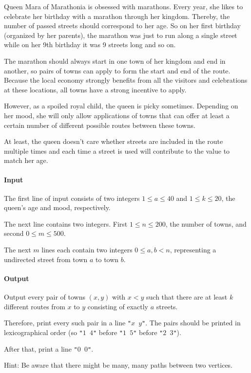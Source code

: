 




Queen Mara of Marathonia is obsessed with marathons. Every year, she likes to celebrate her birthday with a marathon through her kingdom. Thereby, the number of passed streets should correspond to her age. So on her first birthday (organized by her parents), the marathon was just to run along a single street while on her 9th birthday it was 9 streets long and so on.

The marathon should always start in one town of her kingdom and end in another, so pairs of towns can apply to form the start and end of the route. Because the local economy strongly benefits from all the visitors and celebrations at these locations, all towns have a strong incentive to apply.

However, as a spoiled royal child, the queen is picky sometimes. Depending on her mood, she will only allow applications of towns that can offer at least a certain number of different possible routes between these towns.

At least, the queen doesn't care whether streets are included in the route multiple times and each time a street is used will contribute to the value to match her age.

\paragraph*{Input}

The first line of input consists of two integers \(1\le a \le 40\) and \(1\le k \le 20\), the queen's age and mood, respectively.

The next line contains two integers. First \(1 \le n \le 200\), the number of towns, and second \(0\le m \le 500\). 

The next \(m\) lines each contain two integers \(0 \le a,b < n\), representing a undirected street from town \(a\) to town \(b\). 

\paragraph*{Output}
Output every pair of towns \((x,y)\) with \(x < y\) such that there are at least \(k\) different routes from \(x\) to \(y\) consisting of exactly \(a\) streets.

Therefore, print every such pair in a line \texttt{"\(x\) \(y\)"}. The pairs should be printed in lexicographical order (so \texttt{"\(1\) \(4\)"} before \texttt{"\(1\) \(5\)"} before \texttt{"\(2\) \(3\)"}).

After that, print a line \texttt{"\(0\) \(0\)"}.

Hint: Be aware that there might be many, many paths between two vertices.

\begin{samples}
\end{samples}

